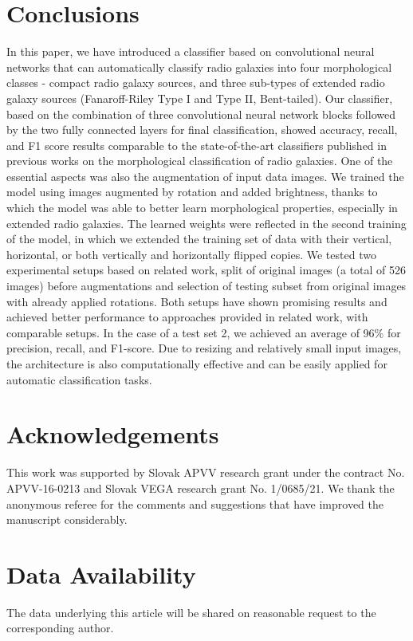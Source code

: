\documentclass[fleqn,usenatbib]{mnras}
\begin{document}
\section{Conclusions}
In this paper, we have introduced a classifier based on convolutional neural networks that can automatically classify radio galaxies into four morphological classes - compact radio galaxy sources, and three sub-types of extended radio galaxy sources (Fanaroff-Riley Type I and Type II, Bent-tailed).  Our classifier, based on the combination of three convolutional neural network blocks followed by the two fully connected layers for final classification, showed accuracy, recall, and F1 score results comparable to the state-of-the-art classifiers published in previous works on the morphological classification of radio galaxies. One of the essential aspects was also the augmentation of input data images. We trained the model using images augmented by rotation and added brightness, thanks to which the model was able to better learn morphological properties, especially in extended radio galaxies. The learned weights were reflected in the second training of the model, in which we extended the training set of data with their vertical, horizontal, or both vertically and horizontally flipped copies. We tested two experimental setups based on related work, split of original images (a total of 526 images) before augmentations and selection of testing subset from original images with already applied rotations. Both setups have  shown promising results and achieved better performance to approaches provided in related work, with comparable setups. In the case of a test set 2, we achieved an average of 96\% for precision, recall, and F1-score.  Due to resizing and relatively small input images, the architecture is also computationally effective and can be easily applied for automatic classification tasks.

\section*{Acknowledgements}
This work was supported by Slovak APVV research grant under the contract No. APVV-16-0213 and Slovak VEGA research grant No. 1/0685/21. We thank the anonymous referee for the comments and suggestions that have improved the manuscript considerably.

\section*{Data Availability}
The data underlying this article will be shared on reasonable request to the corresponding author.
\end{document}
